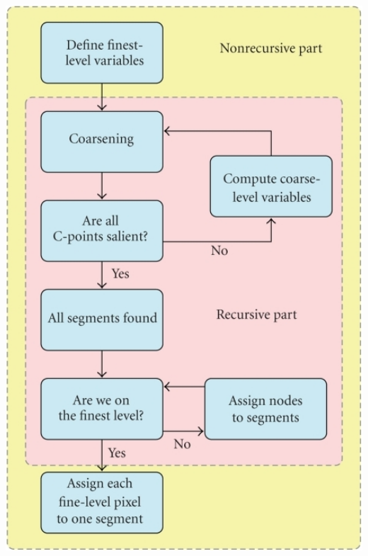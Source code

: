 \documentclass[8pt]{beamer}
\begin{document}
\begin{frame}
\begin{minipage}{.4\textwidth}
\includegraphics[width=1.2\textwidth]{Flow-Chart.png} \hspace{.45cm}
\end{minipage}
\end{frame}
\end{document}
